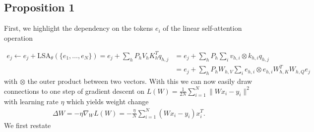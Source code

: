 \documentclass{article}
\newcommand{\lsattn}{\text{LSA}}
\theoremstyle{plain}
\theoremstyle{definition}
\theoremstyle{remark}
\begin{document}
\subsection{Proposition 1}
\label{app:prop1}
First, we highlight the dependency on the tokens $e_i$ of the linear self-attention operation 

\begin{align}
e_j  \leftarrow e_j + \lsattn_{\theta}(\{e_1,\ldots,e_N\}) = e_j + \sum_{h} P_hV_hK_h^{T}q_{h,j} &= e_j + \sum_{h} P_h \sum_{i}  v_{h,i} \otimes k_{h,i}q_{h,j} \nonumber\\
\label{eq:lin_trans}
&= e_j + \sum_{h} P_h W_{h,V}\sum_{i} e_{h,i} \otimes e_{h,i} W_{h,K}^T W_{h,Q}e_{j}
\end{align}
with $\otimes$ the outer product between two vectors. With this we can now easily draw connections to one step of gradient descent on $L(W) = \frac{1}{2N}\sum_{i=1}^{N} \|Wx_i - y_i\|^2$ with learning rate $\eta$ which yields weight change
\begin{align}
    \Delta W = - \eta \nabla_W L(W) = - \frac{\eta}{N} \sum_{i=1}^{N}(Wx_i - y_i)x_i^T.
\end{align}
We first restate
\end{document}
